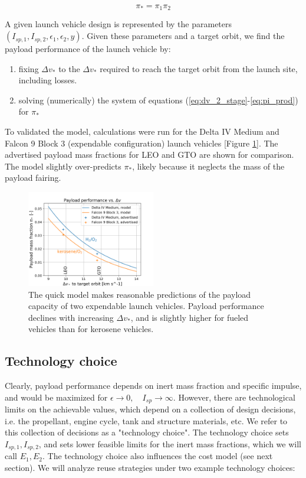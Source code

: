 \documentclass{iaf-iac}
\begin{document}
\begin{multicols}{2}
\begin{equation}
\label{eq:pi_prod}
\pi_* = \pi_1 \pi_2
\end{equation}

A given launch vehicle design is represented by the parameters $(I_{sp,1}, I_{sp,2}, \epsilon_1, \epsilon_2, y)$. Given these parameters and a target orbit, we find the payload performance of the launch vehicle by:

\begin{enumerate}
    \item fixing $\Delta v_*$ to the $\Delta v_*$ required to reach the target orbit from the launch site, including losses.
    \item solving (numerically) the system of equations (\ref{eq:dv_2_stage}-\ref{eq:pi_prod}) for $\pi_*$
\end{enumerate}

To validated the model, calculations were run for the Delta IV Medium and Falcon 9 Block 3 (expendable configuration) launch vehicles [Figure \ref{fig:payload_vs_dv}]. The advertised payload mass fractions for LEO and GTO are shown for comparison. The model slightly over-predicts $\pi_*$, likely because it neglects the mass of the payload fairing.

\begin{figure}[H]
    \centering
    \includegraphics[width=0.5\textwidth]{../../lvreuse/analysis/performance/plots/payload_vs_dv}
    \caption{\label{fig:payload_vs_dv} The quick model makes reasonable predictions of the payload capacity of two expendable launch vehicles. Payload performance declines with increasing $\Delta v_*$, and is slightly higher for  fueled vehicles than for kerosene vehicles.}
\end{figure}

\subsection{Technology choice}
Clearly, payload performance depends on inert mass fraction and specific impulse, and would be maximized for $\epsilon \rightarrow 0, \quad I_{sp} \rightarrow \infty$. However, there are technological limits on the achievable values, which depend on a collection of design decisions, i.e. the propellant, engine cycle, tank and structure materials, etc. We refer to this collection of decisions as a "technology choice". The technology choice sets $I_{sp, 1}, I_{sp, 2}$, and sets lower feasible limits for the inert mass fractions, which we will call $E_1, E_2$. The technology choice also influences the cost model (see next section). We will analyze reuse strategies under two example technology choices:


\end{multicols}
\end{document}
